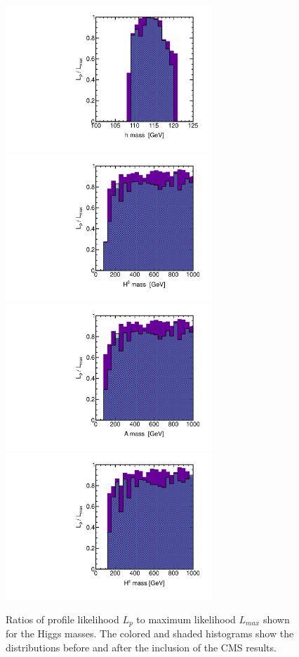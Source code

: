 \begin{figure}[htbp]
\begin{center}
\includegraphics[height=5.5cm]{figs/fig_h.pdf} 
\includegraphics[height=5.5cm]{figs/fig_H0.pdf} \\
\includegraphics[height=5.5cm]{figs/fig_A.pdf} 
\includegraphics[height=5.5cm]{figs/fig_H_pm.pdf} 
\caption{Ratios of profile likelihood $L_p$ to maximum likelihood $L_{max}$ shown for the Higgs masses.  The colored and shaded histograms show the distributions before and after the inclusion of the CMS results.}
\label{fig:LRwcms_Higgs}
\end{center}
\end{figure}


